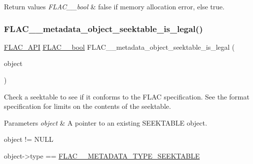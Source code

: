 \begin{DoxyRetVals}{Return values}
{\em F\+L\+A\+C\+\_\+\+\_\+bool} & {\ttfamily false} if memory allocation error, else {\ttfamily true}. \\
\hline
\end{DoxyRetVals}
\mbox{\label{group__flac__metadata__object_ga08f33e2ef85d72363dda82de3208ed1e}} 
\subsubsection{\texorpdfstring{F\+L\+A\+C\+\_\+\+\_\+metadata\+\_\+object\+\_\+seektable\+\_\+is\+\_\+legal()}{FLAC\_\_metadata\_object\_seektable\_is\_legal()}}
{\footnotesize\ttfamily \hyperlink{group__flac__export_ga56ca07df8a23310707732b1c0007d6f5}{F\+L\+A\+C\+\_\+\+A\+PI} \hyperlink{ordinals_8h_a95103469f1cbd78b8cf250194985b34e}{F\+L\+A\+C\+\_\+\+\_\+bool} F\+L\+A\+C\+\_\+\+\_\+metadata\+\_\+object\+\_\+seektable\+\_\+is\+\_\+legal (\begin{DoxyParamCaption}\item[{\hyperlink{zconf_8h_a2c212835823e3c54a8ab6d95c652660e}{const} \hyperlink{struct_f_l_a_c_____stream_metadata}{F\+L\+A\+C\+\_\+\+\_\+\+Stream\+Metadata} $\ast$}]{object }\end{DoxyParamCaption})}

Check a seektable to see if it conforms to the F\+L\+AC specification. See the format specification for limits on the contents of the seektable.


\begin{DoxyParams}{Parameters}
{\em object} & A pointer to an existing S\+E\+E\+K\+T\+A\+B\+LE object.  
\begin{DoxyCode}
\textcolor{keywordtype}{object} != NULL 
\end{DoxyCode}
 
\begin{DoxyCode}
\textcolor{keywordtype}{object}->type == \hyperlink{group__flac__format_ggac71714ba8ddbbd66d26bb78a427fac01a5f6323e489be1318f0e3747960ebdd91}{FLAC\_\_METADATA\_TYPE\_SEEKTABLE} 
\end{DoxyCode}
 \\
\hline
\end{DoxyParams}

